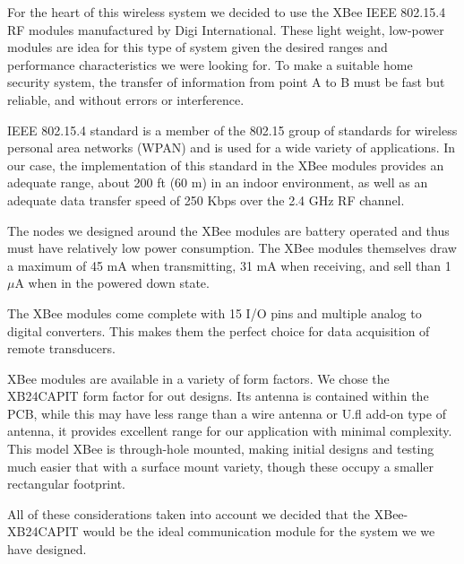 \par For the heart of this wireless system we decided to use the XBee IEEE 802.15.4 RF modules manufactured by Digi International. These light weight, low-power modules are idea for this type of system given the desired ranges and performance characteristics we were looking for. To make a suitable home security system, the transfer of information from point A to B must be fast but reliable, and without errors or interference.
 \par IEEE 802.15.4 standard is a member of the 802.15 group of standards for wireless personal area networks (WPAN) and is used for a wide variety of applications. In our case, the implementation of this standard in the XBee modules provides an adequate range, about 200 ft (60 m) in an indoor environment, as well as an adequate data transfer speed of 250 Kbps over the 2.4 GHz RF channel.     
\par The nodes we designed around the XBee modules are battery operated and thus must have relatively low power consumption. The XBee modules themselves draw a maximum of 45 mA when transmitting, 31 mA when receiving, and sell than 1 $\mu$A when in the powered down state. 
\par The XBee modules come complete with 15 I/O pins and multiple analog to digital converters. This makes them the perfect choice for data acquisition of remote transducers. 
\par XBee modules are available in a variety of form factors. We chose the XB24CAPIT form factor for out designs. Its antenna is contained within the PCB, while this may have less range than a wire antenna or U.fl add-on type of antenna, it provides excellent range for our application with minimal complexity. This model XBee is through-hole mounted, making initial designs and testing much easier that with a surface mount variety, though these occupy a smaller rectangular footprint. 
\par All of these considerations taken into account we decided that the XBee-XB24CAPIT would be the ideal communication module for the system we we have designed. \\